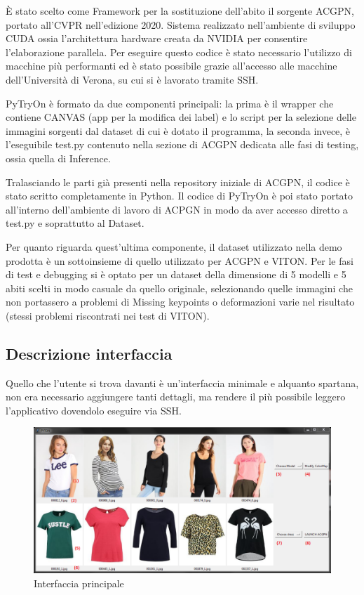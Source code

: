 \documentclass[final, 11pt]{article}
\begin{document}
	È stato scelto come Framework per la sostituzione dell’abito il sorgente ACGPN, portato all’CVPR nell’edizione 2020. 
	Sistema realizzato nell’ambiente di sviluppo CUDA ossia l'architettura hardware creata da NVIDIA per consentire l’elaborazione parallela. Per eseguire questo codice è stato necessario l’utilizzo di macchine più performanti ed è stato possibile grazie all’accesso alle macchine dell’Università di Verona, su cui si è lavorato tramite SSH.
	
	
	PyTryOn è formato da due componenti principali: la prima è il wrapper che contiene CANVAS (app per la modifica dei label) e lo script per la selezione delle immagini sorgenti dal dataset di cui è dotato il programma, la seconda invece, è l’eseguibile test.py contenuto nella sezione di ACGPN dedicata alle fasi di testing, ossia quella di Inference.
	
	Tralasciando le parti già presenti nella repository iniziale di ACGPN, il codice è stato scritto completamente in Python. Il codice di PyTryOn è poi stato portato all’interno dell’ambiente di lavoro di ACPGN in modo da aver accesso diretto a test.py e soprattutto al Dataset.
	
	Per quanto riguarda quest’ultima componente, il dataset utilizzato nella demo prodotta è un sottoinsieme di quello utilizzato per ACGPN e VITON. Per le fasi di test e debugging si è optato per un dataset della dimensione di 5 modelli e 5 abiti scelti in modo casuale da quello originale, selezionando quelle immagini che non portassero a problemi di Missing keypoints o deformazioni varie nel risultato (stessi problemi riscontrati nei test di VITON).
	
	\subsection{Descrizione interfaccia}
	Quello che l’utente si trova davanti è un’interfaccia minimale e alquanto spartana, non era necessario aggiungere tanti dettagli, ma rendere il più possibile leggero l’applicativo dovendolo eseguire via SSH.
	
	\begin{figure}[!htb]
		\centering
		\includegraphics[width=\linewidth]{PyTryOn_numerata_1.png}
		\caption{Interfaccia principale}
	\end{figure} 
\end{document}
